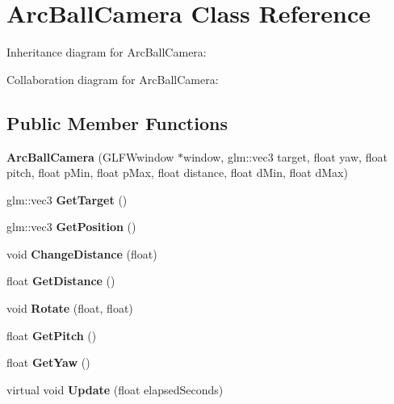\hypertarget{class_arc_ball_camera}{\section{Arc\-Ball\-Camera Class Reference}
\label{class_arc_ball_camera}
}


Inheritance diagram for Arc\-Ball\-Camera\-:


Collaboration diagram for Arc\-Ball\-Camera\-:
\subsection*{Public Member Functions}
\begin{DoxyCompactItemize}
\item 
\hypertarget{class_arc_ball_camera_a60977754d24c81453f65d97299a12815}{{\bfseries Arc\-Ball\-Camera} (G\-L\-F\-Wwindow $\ast$window, glm\-::vec3 target, float yaw, float pitch, float p\-Min, float p\-Max, float distance, float d\-Min, float d\-Max)}\label{class_arc_ball_camera_a60977754d24c81453f65d97299a12815}

\item 
\hypertarget{class_arc_ball_camera_a5f5141057337d1cc405dcbe1c3c41d89}{glm\-::vec3 {\bfseries Get\-Target} ()}\label{class_arc_ball_camera_a5f5141057337d1cc405dcbe1c3c41d89}

\item 
\hypertarget{class_arc_ball_camera_a2e798f405d5725f89e526e8f396bcad4}{glm\-::vec3 {\bfseries Get\-Position} ()}\label{class_arc_ball_camera_a2e798f405d5725f89e526e8f396bcad4}

\item 
\hypertarget{class_arc_ball_camera_ae2516a0a997023bed530c7af32be3173}{void {\bfseries Change\-Distance} (float)}\label{class_arc_ball_camera_ae2516a0a997023bed530c7af32be3173}

\item 
\hypertarget{class_arc_ball_camera_aff6c10ffe339dc9b7e700cd55cbdf6c0}{float {\bfseries Get\-Distance} ()}\label{class_arc_ball_camera_aff6c10ffe339dc9b7e700cd55cbdf6c0}

\item 
\hypertarget{class_arc_ball_camera_acb6aceddf958cdfe236d939905947062}{void {\bfseries Rotate} (float, float)}\label{class_arc_ball_camera_acb6aceddf958cdfe236d939905947062}

\item 
\hypertarget{class_arc_ball_camera_aea1a2e32deba7cb2fae0e7c5da5fe349}{float {\bfseries Get\-Pitch} ()}\label{class_arc_ball_camera_aea1a2e32deba7cb2fae0e7c5da5fe349}

\item 
\hypertarget{class_arc_ball_camera_a717d7ddaf0dcce17a82cbeeb15d7adbb}{float {\bfseries Get\-Yaw} ()}\label{class_arc_ball_camera_a717d7ddaf0dcce17a82cbeeb15d7adbb}

\item 
\hypertarget{class_arc_ball_camera_a93be4d537b37821f6f5400373f9e92cd}{virtual void {\bfseries Update} (float elapsed\-Seconds)}\label{class_arc_ball_camera_a93be4d537b37821f6f5400373f9e92cd}

\end{DoxyCompactItemize}
